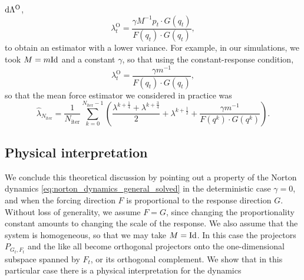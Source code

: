 \begin{example}
    $\mathrm{d} \Lambda^{\mathrm{O}}$,
    \[\lambda_t^{\mathrm{O}}=\frac{\gamma M^{-1}p_t\cdot G(q_t)}{F(q_t)\cdot G(q_t)},\]
    to obtain an estimator with a lower variance. For example, in our simulations, we took $M=m\mathrm{Id}$ and a constant $\gamma$, so that using the constant-response condition, 
    \[\lambda_t^{\mathrm{O}}=\frac{\gamma m^{-1}}{F(q_t)\cdot G(q_t)},\]
    so that the mean force estimator we considered in practice was 
    \begin{equation}
        \label{eq:norton_mean_force_estimator_practical}
        \widehat{\lambda}_{N_\mathrm{iter}}=\frac1{N_{\mathrm{iter}}}\sum_{k=0}^{N_{\mathrm{iter}}-1} \left(\frac{\lambda^{k+\frac14}+\lambda^{k+\frac34}}2+\lambda^{k+\frac12}+\frac{\gamma m^{-1}}{F(q^k)\cdot G(q^k)}\right).
    \end{equation}
\end{example}

\subsection{Physical interpretation}
We conclude this theoretical discussion by pointing out a property of the Norton dynamics \eqref{eq:norton_dynamics_general_solved} in the deterministic case $\gamma=0$, and when the forcing direction $F$ is proportional to the response direction $G$.
Without loss of generality, we assume $F=G$, since changing the proportionality constant amounts to changing the scale of the response.
We also assume that the system is homogeneous, so that we may take $M=\mathrm{Id}$.
In this case the projectors $P_{G_t,F_t}$ and the like all become orthogonal projectors onto the one-dimensional subspace spanned by $F_t$, or its orthogonal complement.
We show that in this particular case there is a physical interpretation for the dynamics

